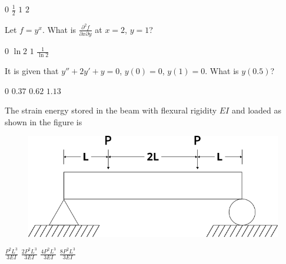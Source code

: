 \documentclass[addpoints,10pt]{exam}
\begin{document}
\begin{questions}
    \begin{oneparchoices}
        \choice $0$
        \choice $\frac{1}{2}$
        \choice $1$
        \choice $2$
    \end{oneparchoices}

    \question Let $f = y^x$. What is $\frac{\partial^2 f}{\partial{x}\partial{y}}$ at $x=2$, $y=1$?

    \begin{oneparchoices}
        \choice $0$
        \choice $\ln 2$
        \choice $1$
        \choice $\frac{1}{\ln 2}$
    \end{oneparchoices}

    \question It is given that $y'' + 2y' + y=0$, $y(0)=0$, $y(1)=0$. What is $y(0.5)$?

    \begin{oneparchoices}
        \choice $0$
        \choice $0.37$
        \choice $0.62$
        \choice $1.13$
    \end{oneparchoices}

    \question The strain energy stored in the beam with flexural rigidity $EI$ and loaded as shown in the figure is
    
    \begin{figure}[h!]
        \centering
        \includegraphics[scale=0.5]{q30}
    \end{figure}

    \begin{oneparchoices}
        \choice $\frac{P^2L^3}{3EI}$
        \choice $\frac{2P^2L^3}{3EI}$
        \choice $\frac{4P^2L^3}{3EI}$
        \choice $\frac{8P^2L^3}{3EI}$
    \end{oneparchoices}

    \question

    \begin{oneparchoices}
        \choice
        \choice
        \choice
        \choice
    \end{oneparchoices}

    \question


\end{questions}
\end{document}
